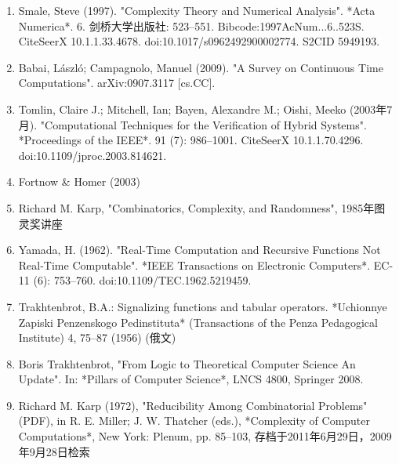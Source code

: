 \begin{enumerate}
\item Smale, Steve (1997). "Complexity Theory and Numerical Analysis". *Acta Numerica*. 6. 剑桥大学出版社: 523–551. Bibcode:1997AcNum...6..523S. CiteSeerX 10.1.1.33.4678. doi:10.1017/s0962492900002774. S2CID 5949193.
\item Babai, László; Campagnolo, Manuel (2009). "A Survey on Continuous Time Computations". arXiv:0907.3117 [cs.CC].
\item Tomlin, Claire J.; Mitchell, Ian; Bayen, Alexandre M.; Oishi, Meeko (2003年7月). "Computational Techniques for the Verification of Hybrid Systems". *Proceedings of the IEEE*. 91 (7): 986–1001. CiteSeerX 10.1.1.70.4296. doi:10.1109/jproc.2003.814621.
\item Fortnow & Homer (2003)
\item Richard M. Karp, "Combinatorics, Complexity, and Randomness", 1985年图灵奖讲座
\item Yamada, H. (1962). "Real-Time Computation and Recursive Functions Not Real-Time Computable". *IEEE Transactions on Electronic Computers*. EC-11 (6): 753–760. doi:10.1109/TEC.1962.5219459.
\item Trakhtenbrot, B.A.: Signalizing functions and tabular operators. *Uchionnye Zapiski Penzenskogo Pedinstituta* (Transactions of the Penza Pedagogical Institute) 4, 75–87 (1956) (俄文)
\item Boris Trakhtenbrot, "From Logic to Theoretical Computer Science An Update". In: *Pillars of Computer Science*, LNCS 4800, Springer 2008.
\item Richard M. Karp (1972), "Reducibility Among Combinatorial Problems" (PDF), in R. E. Miller; J. W. Thatcher (eds.), *Complexity of Computer Computations*, New York: Plenum, pp. 85–103, 存档于2011年6月29日，2009年9月28日检索
\end{enumerate}
